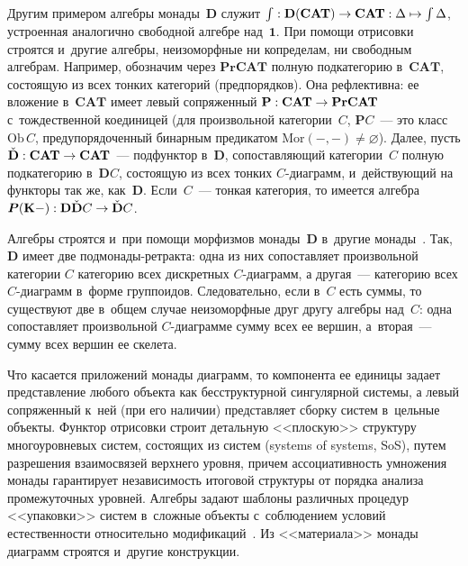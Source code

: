 \begin{multicols}{2}
     Другим примером алгебры монады~$\mathbf{D}$ служит $\int : 
\mathbf{D}(\mathbf{CAT}) \hm\to  \mathbf{CAT} : \Delta \hm\mapsto \int \Delta$, 
устроенная аналогично свободной алгебре над~$\bm{1}$. При помощи 
отрисовки строятся и~другие алгебры, неизоморфные ни копределам, ни 
свободным алгебрам. Например, обозначим через $\mathbf{PrCAT}$ полную 
подкатегорию в~$\mathbf{CAT}$, состоящую из всех тонких категорий 
(предпорядков). Она рефлективна: ее вложение в~$\mathbf{CAT}$ имеет левый 
сопряженный $\mathbf{P} : \mathbf{CAT} \hm\to \mathbf{PrCAT}$ 
с~тождественной коединицей (для произвольной категории~$C$,  
$\bm{P}C$~--- это класс $\mathrm{Ob}\,C$, предупорядоченный бинарным 
предикатом $\mathrm{Mor}(-, -) \not= \varnothing$). Далее, пусть 
$\Check{\mathbf{D}} : \mathbf{CAT}\hm\to \mathbf{ CAT}$~--- подфунктор 
в~$\mathbf{D}$, сопоставляющий категории~$C$ полную подкатегорию 
в~$\mathbf{D}C$, состоящую из всех тонких $C$-диа\-грамм, и~действующий 
на функторы так же, как~$\mathbf{D}$. Если~$C$~--- тонкая категория, то 
имеется алгебра $\bm{P}(\mathbf{K}-) : \mathbf{D}\Check{\mathbf{D}}C \hm\to 
\Check{\mathbf{D}}C$.
     
     Алгебры строятся и~при помощи морфизмов монады~$\mathbf{D}$ в~другие монады~\cite[упражнение~6.2.3(б)]{8-kov}. Так, $\mathbf{D}$ имеет две 
под\-мо\-на\-ды-ре\-трак\-та: одна из них сопоставляет произвольной категории 
$C$ категорию всех дискретных $C$-диа\-грамм, а другая~--- категорию всех  
$C$-диа\-грамм в~форме группоидов. Следовательно, если в~$C$ есть суммы, то 
существуют две в~общем случае неизоморфные друг другу алгебры над~$C$: 
одна сопоставляет произвольной \mbox{$C$-диа}\-грам\-ме сумму всех ее вершин, 
а~вторая~--- сумму всех вершин ее скелета.
     
     Что касается приложений монады диаграмм, то компонента ее единицы 
задает представление любого объекта как бесструктурной сингулярной 
системы, а левый сопряженный к~ней (при его наличии) представляет сборку 
систем в~цельные объекты. Функтор отрисовки строит детальную <<плоскую>> 
структуру многоуровневых систем, состоящих из систем (systems of systems, 
SoS), путем разрешения взаимосвязей верхнего уровня, причем 
ассоциативность умножения монады гарантирует независимость итоговой 
структуры от порядка анализа промежуточных уровней. Алгебры задают 
шаблоны различных процедур <<упаковки>> систем в~сложные объекты 
с~соблюдением условий естественности относительно  
модификаций~\cite{7-kov}. Из <<материала>> монады диаграмм строятся и~другие конструкции.


\end{multicols}
